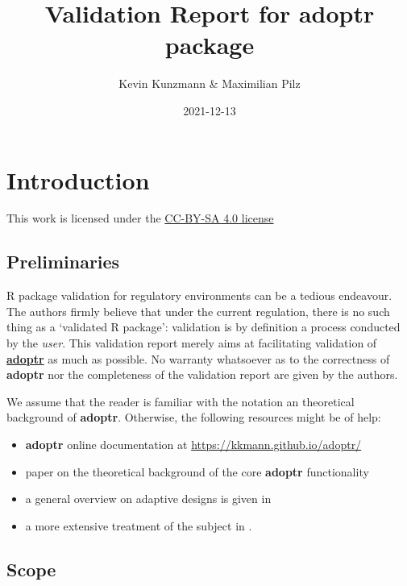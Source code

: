 \documentclass[
]{book}
\title{Validation Report for \textbf{adoptr} package}
\author{Kevin Kunzmann \& Maximilian Pilz}
\date{2021-12-13}
\providecommand{\tightlist}{%
  \setlength{\itemsep}{0pt}\setlength{\parskip}{0pt}}
\begin{document}
\maketitle

{
\setcounter{tocdepth}{1}
\tableofcontents
}
\hypertarget{introduction}{%
\chapter{Introduction}\label{introduction}}

This work is licensed under the \href{https://creativecommons.org/licenses/by-sa/4.0/deed.en}{CC-BY-SA 4.0 license}

\hypertarget{preliminaries}{%
\section{Preliminaries}\label{preliminaries}}

R package validation for regulatory environments can be a
tedious endeavour.
The authors firmly believe that under the current regulation,
there is no such thing as a `validated R package':
validation is by definition a process conducted by the \emph{user}.
This validation report merely aims at facilitating
validation of \textbf{\href{https://github.com/kkmann/adoptr}{adoptr}} as
much as possible.
No warranty whatsoever as to the correctness of \textbf{adoptr} nor the
completeness of the validation report are given by the authors.

We assume that the reader is familiar with the notation an theoretical
background of \textbf{adoptr}.
Otherwise, the following resources might be of help:

\begin{itemize}
\tightlist
\item
  \textbf{adoptr} online documentation at \url{https://kkmann.github.io/adoptr/}
\item
  paper on the theoretical background of the core \textbf{adoptr} functionality \citep{variational}
\item
  a general overview on adaptive designs is given in \citep{Bauer2015}
\item
  a more extensive treatment of the subject in \citep{Wassmer2016}.
\end{itemize}

\hypertarget{scope}{%
\section{Scope}\label{scope}}
\end{document}
